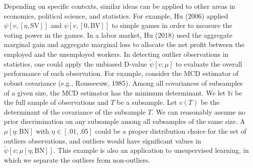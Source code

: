 \documentclass[a4paper,12pt]{article}
\begin{document}
Depending on specific contexts, similar ideas can be applied to other areas in economics, 
political science, and statistics. For example, Hu (2006) applied $\psi[v, [\eta, \mathrm{SV}]]$ and $\psi[v, [0, \mathrm{BV}]]$ to simple games in order to measure the voting power in the games.
In a labor market, Hu (2018) used the aggregate marginal gain and aggregate marginal loss to allocate the net profit between the employed and the unemployed workers.
In detecting outlier observations in statistics, one could apply the unbiased D-value $\tilde \psi [v;\mu]$ to evaluate the overall performance of each observation.
For example, consider the MCD estimator of robust covariance (e.g., Rousseeuw, 1985). 
Among all covariances of subsamples of a given size,
the MCD estimator has the minimum determinant. We let $\mathbb{N}$ be the full sample of observations and
$T$ be a subsample. Let $v(T)$ be the determinant of the covariance of the subsample $T$.
We can reasonably assume no prior discrimination on any subsample among all subsamples of the same size.
A $\mu[\eta; \mathrm{BN}]$ with $\eta \in [.01,.05]$ could be a proper distribution choice 
for the set of outliers observations, and outliers would have significant values in $\tilde \psi[v; \mu[\eta;\mathrm{BN}]]$. 
This example is also an application to unsupervised learning, in which we separate the outliers from non-outliers.
\end{document}
